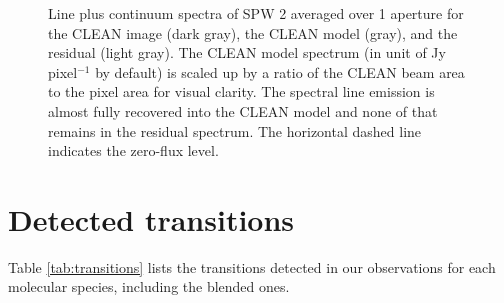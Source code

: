 \documentclass[linenumbers, twocolumn, twocolappendix, astrosymb, times]{aastex631}
\begin{document}
\begin{figure*}
\caption{Line plus continuum spectra of SPW 2 averaged over 1 aperture for the CLEAN image (dark gray), the CLEAN model (gray), and the residual (light gray). The CLEAN model spectrum (in unit of Jy pixel$^{-1}$ by default) is scaled up by a ratio of the CLEAN beam area to the pixel area for visual clarity. The spectral line emission is almost fully recovered into the CLEAN model and none of that remains in the residual spectrum. The horizontal dashed line indicates the zero-flux level.}
\label{fig:JvM_spectrum}
\end{figure*}


\section{Detected transitions}\label{appendix:transitions}
Table \ref{tab:transitions} lists the transitions detected in our observations for each molecular species, including the blended ones.
\end{document}
